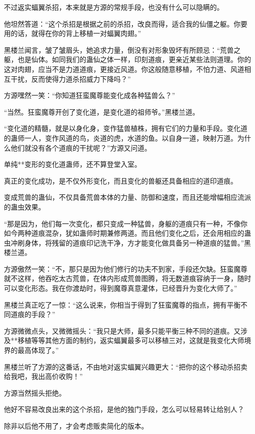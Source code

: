 \begin{this_body}
不过返实蝠翼杀招，本来就是方源的常规手段，也没有什么可以隐瞒的。

他坦然答道：“这个杀招是根据之前的杀招，改良而得，适合我的仙僵之躯。你要用的话，就得在你的背上移植一对蝠翼肉翅。”

黑楼兰闻言，皱了皱眉头，她追求力量，倒没有对形象毁坏有所顾忌：“荒兽之躯，也是仙体。如同我们的蛊仙之体一样，印刻道痕，更亲近某些法则道理。你的这对肉翅，应当不是力道道痕，更接近风道。你这般随意移植，不怕力道、风道相互干扰，反而使得力道杀招威力下降吗？”

方源嘿然一笑：“你知道狂蛮魔尊能变化成各种猛兽么？”

“当然。狂蛮魔尊开创了变化道，是变化道的祖师爷。”黑楼兰道。

“变化道的精髓，就是以身化身，变作猛兽植株，拥有它们的力量和手段。变化道的蛊师一人，变作风道的鸟，炎道的虎，水道的鱼。以自身一道，映射万道。为什么他们就没有各个道痕的干扰呢？”方源又问道。

单纯**变形的变化道蛊师，还不算登堂入室。

真正的变化成功，是不仅外形变化，而且变化的兽躯还具备相应的道印道痕。

变成荒兽的蛊仙，不仅具备荒兽本体的力量、防御和速度，而且还能增幅相应流派的蛊虫效果。

“那是因为，他们每一次变化，都只变成一种猛兽，身躯的道痕只有一种，不像你如今两种道痕混杂，犹如蛊师时期兼修两道。而且他们变化之后，还会用相应的蛊虫冲刷身体，将残留的道痕印记洗干净，方才能变化做具备另一种道痕的猛兽。”黑楼兰道。

方源傲然一笑：“不，那只是因为他们修行的功夫不到家，手段还欠缺。狂蛮魔尊就不这样，他吞吃太古荒兽，在体内形成荒兽图腾，将无数道痕容纳于一身，随时可以变化形态。我在你渡劫时，得到魔尊真意灌体，已经晋升为变化大师了。”

黑楼兰真正吃了一惊：“这么说来，你相当于得到了狂蛮魔尊的指点，拥有平衡不同道痕的手段？”

方源微微点头，又微微摇头：“我只是大师，最多只能平衡三种不同的道痕。又涉及**移植等等其他方面的制约，返实蝠翼最多可以移植三对，这就是我变化大师境界的最高体现了。”

黑楼兰听了方源的这番话，不由地对返实蝠翼兴趣更大：“把你的这个移动杀招卖给我吧，我出高价收购！”

方源当然摇头拒绝。

他好不容易改良出来的这个杀招，是他的独门手段，怎么可以轻易转让给别人？

除非以后他不用了，才会考虑贩卖简化的版本。


\end{this_body}
